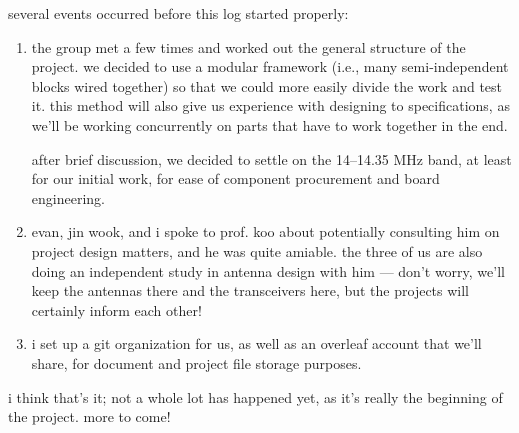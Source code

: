 several events occurred before this log started properly:
\begin{enumerate}
	\item the group met a few times and worked out the general structure of
	the project. we decided to use a modular framework (i.e., many
	semi-independent blocks wired together) so that we could more easily
	divide the work and test it. this method will also give us experience
	with designing to specifications, as we'll be working concurrently on
	parts that have to work together in the end.

	after brief discussion, we decided to settle on the 14--14.35 MHz band,
	at least for our initial work, for ease of component procurement and
	board engineering.

	\item evan, jin wook, and i spoke to prof. koo about potentially
	consulting him on project design matters, and he was quite amiable. the
	three of us are also doing an independent study in antenna design with
	him --- don't worry, we'll keep the antennas there and the transceivers
	here, but the projects will certainly inform each other!

	\item i set up a git organization for us, as well as an overleaf
	account that we'll share, for document and project file storage
	purposes.
\end{enumerate}
i think that's it; not a whole lot has happened yet, as it's really the
beginning of the project. more to come!

